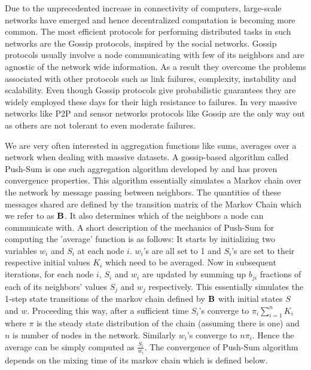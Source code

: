 \documentclass[runningheads,a4paper]{llncs}
\begin{document}
Due to the unprecedented increase in connectivity of computers, large-scale networks have emerged and hence decentralized computation is becoming more common. The most efficient protocols for performing distributed tasks in such networks are the Gossip protocols, inspired by the social networks. Gossip protocols usually involve a node communicating with few of its neighbors and are agnostic of the network wide information. As a result they overcome the problems associated with other protocols such as link failures, complexity, instability and scalability. Even though Gossip protocols give probabilistic guarantees they are widely employed these days for their high resistance to failures. In very massive networks like P2P and sensor networks protocols like Gossip are the only way out as others are not tolerant to even moderate failures.
 
We are very often interested in aggregation functions like sums, averages over a network when dealing with massive datasets. A gossip-based algorithm called Push-Sum is one such aggregation algorithm developed by \cite{Kempe03gossip-basedcomputation} and has proven convergence properties. This algorithm essentially simulates a Markov chain over the network by message passing between neighbors. The quantities of these messages shared are defined by the transition matrix of the Markov Chain which we refer to as $\bf{B}$. It also determines which of the neighbors a node can communicate with. A short description of the mechanics of Push-Sum for computing the 'average' function is as follows: It starts by initializing two variables $w_i$ and $S_i$ at each node $i$. $w_i$'s are all set to 1 and $S_i$'s are set to their respective initial values $K_i$ which need to be averaged. Now in subsequent iterations, for each node $i$, $S_i$ and $w_i$ are updated by summing up $b_{ji}$ fractions of each of its neighbors' values $S_j$ and $w_j$ respectively. This essentially simulates the 1-step state transitions of the markov chain defined by $\bf{B}$ with initial states $S$ and $w$. Proceeding this way, after a sufficient time $S_i$'s converge to  $\pi_i \sum_{i=1}^{n}K_i$ where ${\pi}$ is the steady state distribution of the chain (assuming there is one) and $n$ is number of nodes in the network. Similarly $w_i$'s converge to $n \pi_i$. Hence the average can be simply computed as $\frac{S_i}{w_i}$. The convergence of Push-Sum algorithm depends on the mixing time of its markov chain which is defined below.
\end{document}
